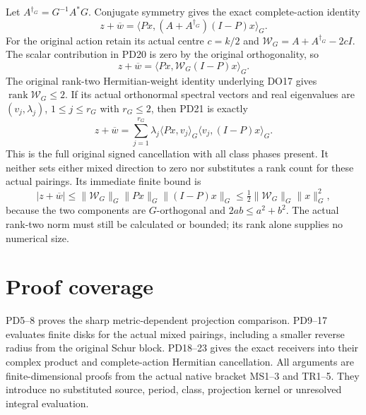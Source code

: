 \documentclass[11pt]{article}
\newcommand{\rank}{\operatorname{rank}}
\begin{document}
Let $A^{\dagger_G}=G^{-1}A^*G$.  Conjugate symmetry gives the exact
complete-action identity
\[
 \boxed{z+\overline w
       =\langle Px,(A+A^{\dagger_G})(I-P)x\rangle_G.}            \tag{PD20}
\]
For the original action retain its actual centre $c=k/2$ and
$\mathcal W_G=A+A^{\dagger_G}-2cI$.  The scalar contribution in
PD20 is zero by the original orthogonality, so
\[
 z+\overline w=\langle Px,\mathcal W_G(I-P)x\rangle_G.           \tag{PD21}
\]
The original rank-two Hermitian-weight identity underlying DO17
gives $\rank\mathcal W_G\le2$.  If its actual orthonormal spectral
vectors and real eigenvalues are $(v_j,\lambda_j)$, $1\le j\le r_G$
with $r_G\le2$, then PD21 is exactly
\[
 z+\overline w
   =\sum_{j=1}^{r_G}\lambda_j
       \langle Px,v_j\rangle_G\langle v_j,(I-P)x\rangle_G.        \tag{PD22}
\]
This is the full original signed cancellation with all class phases
present.  It neither sets either mixed direction to zero nor
substitutes a rank count for these actual pairings.  Its immediate
finite bound is
\[
 |z+\overline w|
 \le\|\mathcal W_G\|_G\|Px\|_G\|(I-P)x\|_G
 \le\tfrac12\|\mathcal W_G\|_G\|x\|_G^2,                      \tag{PD23}
\]
because the two components are $G$-orthogonal and
$2ab\le a^2+b^2$.  The actual rank-two norm must still be
calculated or bounded; its rank alone supplies no numerical size.

\section{Proof coverage}
PD5--8 proves the sharp metric-dependent projection comparison.
PD9--17 evaluates finite disks for the actual mixed pairings,
including a smaller reverse radius from the original Schur block.
PD18--23 gives the exact receivers into their complex product and
complete-action Hermitian cancellation.  All arguments are
finite-dimensional proofs from the actual native bracket MS1--3
and TR1--5.  They introduce no substituted source, period, class,
projection kernel or unresolved integral evaluation.
\end{document}
